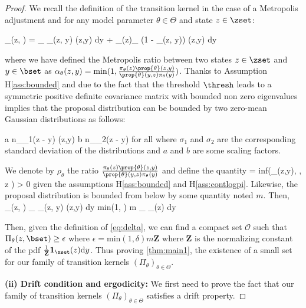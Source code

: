 \documentclass[10pt,twocolumn,letterpaper]{article}
\begin{document}
\begin{proof}
We recall the definition of the transition kernel in the case of a Metropolis adjustment and for any model parameter $\theta \in \Theta$ and state $z \in \zset$:

\beq 
\Pi_\theta(z, \bset) = \int_{\bset} \alpha_\theta(z, y) \prop{\theta}(z,y) \textrm{d}y + _{\bset(z)}\int_{\zset} (1 - \alpha_\theta(z, y)) \prop{\theta}(z,y) \textrm{d}y
\eeq

where we have defined the Metropolis ratio between two states $z \in \zset$ and $y \in \bset$ as $\alpha_\theta(z, y) = \textrm{min}(1, \frac{\pi_\theta(z)  \prop{\theta}(z,y)}{\prop{\theta}(y,z) \pi_\theta(y)  })$.
Thanks to Assumption H\ref{ass:bounded} and due to the fact that the threshold $\thresh$ leads to a symmetric positive definite covariance matrix with bounded non zero eigenvalues implies that the proposal distribution can be bounded by two zero-mean Gaussian distributions as follows:

\beq\label{eq:twogauss}
a n_{\sigma_1}(z - y) \leq \prop{\theta}(z,y)  \leq b n_{\sigma_2}(z - y) \quad \textrm{for all} \quad \theta \in \Theta
\eeq
where $\sigma_1$ and $\sigma_2$ are the corresponding standard deviation of the distributions and $a$ and $b$ are some scaling factors.

We denote by $\rho_\theta$ the ratio $\frac{\pi_\theta(z)  \prop{\theta}(z,y)}{\prop{\theta}(y,z) \pi_\theta(y)  }$ and define the quantity 
\beq\label{eq:delta}
\delta = \textrm{inf}(\rho_\theta(z,y), \theta \in \Theta, \quad z \in {} ) > 0
\eeq
 given the assumptions H\ref{ass:bounded} and H\ref{ass:contlogpi}.
Likewise, the proposal distribution is bounded from below by some quantity noted $m$.
Then,
\beq
\Pi_\theta(z, \bset) \geq  \int_{\bset \cap \xset} \alpha_\theta(z, y) \prop{\theta}(z,y) \textrm{d}y \geq \textrm{min}(1, \delta) m \int_{\bset} _\xset(z)  \textrm{d}y
\eeq

Then, given the definition of \eqref{eq:delta}, we can find a compact set $\mathcal{O}$ such that $\Pi_\theta(z, \bset) \geq  \epsilon$ where $\epsilon = \textrm{min}(1, \delta) m \textbf{Z}$ where $\textbf{Z}$ is the normalizing constant of the pdf $\frac{1}{\textbf{Z}}\mathbf{1}_\xset(z)  \textrm{d}y$.
Thus proving \eqref{thm:main1}, \ie the existence of a small set for our family of transition kernels $(\Pi_\theta)_{\theta \in \Theta}$.

\medskip
\noindent \textbf{(ii) Drift condition and ergodicity: }
We first need to prove the fact that our family of transition kernels $(\Pi_\theta)_{\theta \in \Theta}$ satisfies a drift property.


\end{proof}
\end{document}

